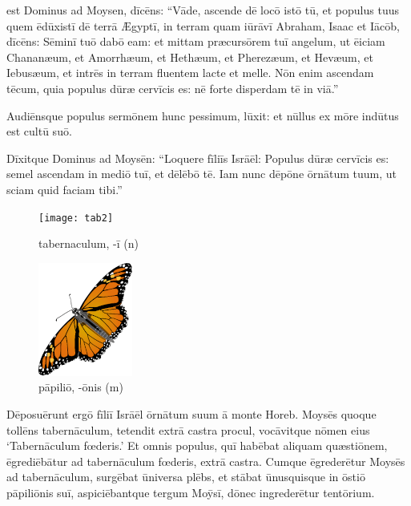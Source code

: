 

\thispagestyle{empty}

 est Dominus ad Moysen, dīcēns: ``Vāde, ascende
dē locō istō tū, et populus tuus quem ēdūxistī dē terrā Ægyptī, in terram
quam iūrāvī Abraham, Isaac et Iācōb, dīcēns:
Sēminī tuō dabō eam: 
et mittam præcursōrem tuī
angelum, ut ēiciam Chananæum, et
Amorrhæum, et Hethæum, et Pherezæum, et Hevæum, et Iebusæum, 
et intrēs in
terram fluentem lacte et melle. Nōn enim ascendam tēcum, quia populus dūræ
cervīcis es: nē
forte disperdam tē in viā.''

Audiēnsque
populus sermōnem hunc pessimum, lūxit: et nūllus ex mōre indūtus est cultū
suō. 

Dīxitque Dominus ad Moysēn: ``Loquere fīliīs Isrāēl:
Populus dūræ cervīcis es: semel ascendam in mediō tuī, et dēlēbō tē. Iam
nunc dēpōne ōrnātum tuum, ut sciam quid faciam tibi.''

\begin{figure}[h!]
    \begin{minipage}[hp]{0.5\linewidth}
        \centering
        \texttt{[image: tab2]}
        \caption{tabernaculum, -ī (n)}
    \end{minipage}%
    \begin{minipage}[hp]{0.5\linewidth}
        \centering
        \includegraphics{papilio}
        \caption{pāpiliō, -ōnis (m)}
    \end{minipage}
\end{figure}

Dēposuērunt ergō
fīliī Isrāēl ōrnātum suum ā monte Horeb. 
Moysēs quoque tollēns tabernāculum,
tetendit extrā castra procul, vocāvitque nōmen eius `Tabernāculum fœderis.'
Et omnis populus, quī habēbat aliquam quæstiōnem, ēgrediēbātur ad
tabernāculum fœderis, extrā castra. 
Cumque ēgrederētur Moysēs ad
tabernāculum, surgēbat ūniversa plēbs, et stābat ūnusquisque in ōstiō pāpiliōnis
suī, aspiciēbantque tergum Moȳsī, dōnec ingrederētur tentōrium. 

